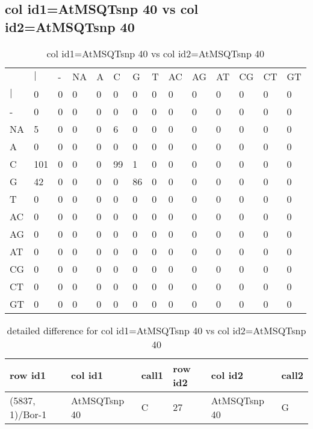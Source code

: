 \subsection{col id1=AtMSQTsnp 40 vs col id2=AtMSQTsnp 40}
\begin{center}
\begin{longtable}{|l|l|l|l|l|l|l|l|l|l|l|l|l|l|}
\caption{col id1=AtMSQTsnp 40 vs col id2=AtMSQTsnp 40} \label{table_dm912}\\
\hline
\\
\hline
&$|$&-&NA&A&C&G&T&AC&AG&AT&CG&CT&GT\\
$|$&0&0&0&0&0&0&0&0&0&0&0&0&0\\
-&0&0&0&0&0&0&0&0&0&0&0&0&0\\
NA&5&0&0&0&6&0&0&0&0&0&0&0&0\\
A&0&0&0&0&0&0&0&0&0&0&0&0&0\\
C&101&0&0&0&99&1&0&0&0&0&0&0&0\\
G&42&0&0&0&0&86&0&0&0&0&0&0&0\\
T&0&0&0&0&0&0&0&0&0&0&0&0&0\\
AC&0&0&0&0&0&0&0&0&0&0&0&0&0\\
AG&0&0&0&0&0&0&0&0&0&0&0&0&0\\
AT&0&0&0&0&0&0&0&0&0&0&0&0&0\\
CG&0&0&0&0&0&0&0&0&0&0&0&0&0\\
CT&0&0&0&0&0&0&0&0&0&0&0&0&0\\
GT&0&0&0&0&0&0&0&0&0&0&0&0&0\\
\hline
\end{longtable}
\end{center}

\begin{center}
\begin{longtable}{|l|l|l|l|l|l|}
\caption{detailed difference for col id1=AtMSQTsnp 40 vs col id2=AtMSQTsnp 40} \label{table_dm913}\\
\hline
row id1&col id1&call1&row id2&col id2&call2\\
\hline
(5837, 1)/Bor-1&AtMSQTsnp 40&C&27&AtMSQTsnp 40&G\\
\hline
\end{longtable}
\end{center}

